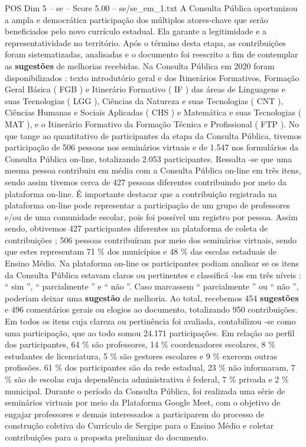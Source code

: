 \begin{textsample}{POS Dim 5 – se – Score 5.00 – se/se\_em\_1.txt}
A Consulta Pública oportunizou a ampla e democrática participação dos múltiplos atores-chave que serão beneficiados pelo novo currículo estadual.
Ela garante a legitimidade e a representatividade no território.
Após o término desta etapa, as contribuições foram sistematizadas, analisadas e o documento foi reescrito a fim de contemplar as \textbf{sugestões} de melhorias recebidas.
Na Consulta Pública em 2020 foram disponibilizados : texto introdutório geral e dos Itinerários Formativos, Formação Geral Básica ( FGB ) e Itinerário Formativo ( IF ) das áreas de Linguagens e suas Tecnologias ( LGG ), Ciências da Natureza e suas Tecnologias ( CNT ), Ciências Humanas e Sociais Aplicadas ( CHS ) e Matemática e suas Tecnologias ( MAT ), e o Itinerário Formativo da Formação Técnica e Profissional ( FTP ).
No que tange ao quantitativo de participantes da etapa da Consulta Pública, tivemos participação de 506 pessoas nos seminários virtuais e de 1.547 nos formulários da Consulta Pública on-line, totalizando 2.053 participantes.
Ressalta -se que uma mesma pessoa contribuiu em média com a Consulta Pública on-line em três itens, sendo assim tivemos cerca de 427 pessoas diferentes contribuindo por meio da plataforma on-line.
É importante destacar que a contribuição registrada na plataforma on-line pode representar a participação de um grupo de professores e/ou de uma comunidade escolar, pois foi possível um registro por pessoa.
Assim sendo, obtivemos 427 participantes diferentes na plataforma de coleta de contribuições ; 506 pessoas contribuíram por meio dos seminários virtuais, sendo que estes representam 71 \% dos municípios e 48 \% das escolas estaduais de Ensino Médio.
Na plataforma on-line os participantes podiam analisar se os itens da Consulta Pública estavam claros ou pertinentes e classificá -los em três níveis : “ sim ”, “ parcialmente ” e “ não ”.
Caso marcassem “ parcialmente ” ou “ não ”, poderiam deixar uma \textbf{sugestão} de melhoria.
Ao total, recebemos 454 \textbf{sugestões} e 496 comentários gerais ou elogios ao documento, totalizando 950 contribuições.
Em todos os itens cuja clareza ou pertinência foi avaliada, contabilizou -se como uma participação, que ao todo somou 24.171 participações.
Em relação ao perfil dos participantes, 64 \% são professores, 14 \% coordenadores escolares, 8 \% estudantes de licenciatura, 5 \% são gestores escolares e 9 \% exercem outras profissões. 61 \% dos participantes são da rede estadual, 23 \% não informaram, 7 \% são de escolas cuja dependência administrativa é federal, 7 \% privada e 2 \% municipal.
Durante o período da Consulta Pública, foi realizada uma série de seminários virtuais por meio da Plataforma Google Meet, com o objetivo de engajar professores e demais interessados a participarem do processo de construção coletiva do Currículo de Sergipe para o Ensino Médio e coletar contribuições para a proposta preliminar do documento.

\end{textsample}
